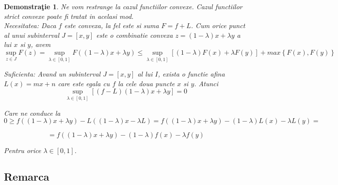 \documentclass[a4paper,12pt,oneside]{report}
\newtheorem{demonstration}{Demonstra\c tie}
\begin{document}
\begin{demonstration}
Ne vom restrange la cazul functiilor convexe. Cazul functiilor strict convexe poate fi tratat in acelasi mod. 
\\ Necesitatea: Daca \(f\) este convexa, la fel este si suma \(F = f + L\). Cum orice punct al unui subinterval \(J = \left [ x , y \right ]\) este o combinatie convexa \(z = \left ( 1 - \lambda  \right )x + \lambda y \) a lui \(x\) si \(y\), avem
\begin{displaymath}
  \sup_{z\in J}F\left ( z \right ) = \sup_{\lambda \in \left [ 0 , 1 \right ]}F\left ( \left ( 1 - \lambda  \right )x + \lambda y \right )\leq \sup_{\lambda \in \left [ 0,1 \right ]}\left [ \left ( 1-\lambda  \right )F\left ( x \right ) + \lambda F\left ( y \right ) \right ] + max \left \{ F\left ( x \right ), F\left ( y \right ) \right \}
\end{displaymath}

Suficienta: Avand un subinterval \(J = \left [ x,y \right ]\) al lui \(I\), exista o functie afina \(L\left ( x \right ) = mx + n\) care este egala cu \(f\) la cele doua puncte  \(x\) si \(y\). 
Atunci
\begin{displaymath}
  \sup_{\lambda \in \left [ 0,1 \right ]}\left [ \left ( f - L \right )\left ( 1 - \lambda  \right )x + \lambda y \right ] = 0
\end{displaymath}

Care ne conduce la 
\begin{displaymath}
  0\geq f\left ( \left ( 1 - \lambda  \right )x + \lambda y \right )- L\left ( \left ( 1 - \lambda  \right )x - \lambda L \right )= f\left ( \left ( 1 - \lambda  \right )x + \lambda y  \right ) - \left ( 1 - \lambda  \right )L\left ( x \right ) - \lambda L\left ( y \right ) =
\end{displaymath}

\begin{displaymath}
  = f\left ( \left ( 1 - \lambda  \right )x + \lambda y \right ) - \left ( 1 - \lambda  \right ) f\left ( x \right ) - \lambda f \left ( y \right )
\end{displaymath}


Pentru orice \(\lambda \in \left [ 0,1 \right ]\). 

\end{demonstration}

\subsection{Remarca}
\end{document}
